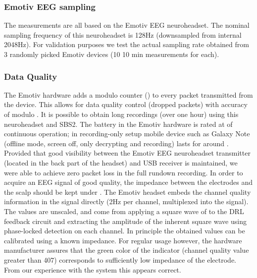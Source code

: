 \documentclass[10pt]{article}
\begin{document}
\begin{center}
		\subsubsection{Emotiv EEG sampling}
The measurements are all based on the Emotiv EEG neuroheadset. The nominal sampling frequency of this neuroheadset is 128Hz (downsampled from internal 2048Hz). For validation purposes we test the actual sampling rate obtained from 3 randomly picked Emotiv devices (10  10 min measurements for each).
\subsubsection{Data Quality}
The Emotiv hardware adds a modulo  counter () to every packet transmitted from the device. This allows for data quality control (dropped packets) with accuracy of modulo . It is possible to obtain long recordings (over one hour) using this neuroheadset and SBS2. The battery in the Emotiv hardware is rated at  of continuous operation; in recording-only setup mobile device such as Galaxy Note (offline mode, screen off, only decrypting and recording) lasts for around . Provided that good visibility between the Emotiv EEG neuroheadset transmitter (located in the back part of the headset) and USB receiver is maintained, we were able  to achieve zero packet loss in the full rundown recording.
In order to acquire an EEG signal of good quality, the impedance between the electrodes and the scalp should be kept under . The Emotiv headset embeds the channel quality information in the signal directly (2Hz per channel, multiplexed into the signal). The values are unscaled, and come from applying a square wave of  to the DRL feedback circuit and extracting the amplitude of the inherent square wave using phase-locked detection on each channel. In principle the obtained values can be calibrated using a known impedance. For regular usage however, the hardware manufacturer assures that the green color of the indicator (channel quality value greater than 407) corresponds to sufficiently low impedance of the electrode. From our experience with the system this appears correct.

\end{center}
\end{document}
